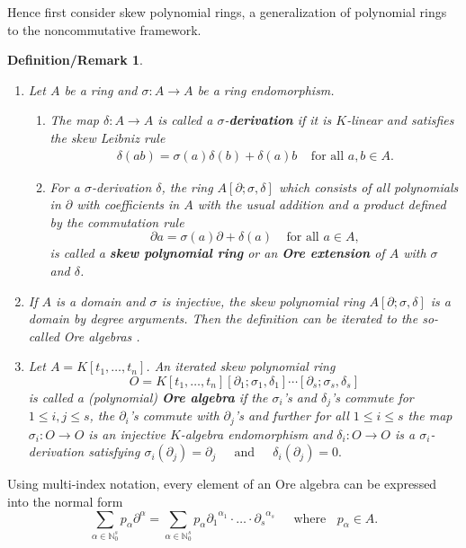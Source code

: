 \documentclass[a4paper,10pt]{article}
\newtheorem{definitionremark}[Th]{Definition/Remark}
\theoremstyle{nonumberplain}
\newcommand{\N}{\mathbb{N}}
\begin{document}
Hence first consider skew polynomial rings, a generalization of polynomial rings to 
the noncommutative framework. 

\begin{definitionremark} \cite{MR} \
\label{defOre}
\begin{enumerate} 
\item[(1)] Let $A$ be a ring and $\sigma : A \rightarrow A$ be a ring endomorphism.
\begin{enumerate} 
\item The map $\delta : A \rightarrow A$ is called a $\sigma$-\textbf{derivation} if it is 
$K$-linear and satisfies the skew Leibniz rule
\begin{align}\label{deltaOperation}
\delta(a b) = \sigma(a) \delta(b) + \delta(a) b \;\;\;\; \mbox{for all } a, b \in A.
\end{align}
\item For a $\sigma$-derivation $\delta$, the ring $A\left[ \partial;\sigma, \delta \right] $ 
which
consists of all polynomials in $\partial$ with coefficients in $A$ with the usual addition 
and a product defined by the commutation rule
$$\partial a = \sigma(a) \partial + \delta(a) \;\;\;\; \mbox{for all } a \in A,$$
is called a \textbf{skew polynomial ring} or an \textbf{Ore extension} of $A$ with $\sigma$ and $\delta$.
\end{enumerate}
\item[] If $A$ is a domain and $\sigma$ is injective, the 
skew polynomial ring $A\left[ \partial;\sigma, \delta \right]$ is a domain by degree arguments. 
Then the definition can be iterated to the so-called Ore algebras \cite{CS}.
\item[(2)] Let $A=K[t_1, \dots, t_n]$. An iterated skew polynomial ring 
$$O=K[t_1, \dots, t_n] [\partial_1;\sigma_1, \delta_1]  \cdots [\partial_s;\sigma_s, \delta_s]$$ 
is called a (polynomial) \textbf{Ore algebra} if the $\sigma_i$'s and $\delta_j$'s commute for $ 1 \leq i , j \leq s $, 
the $\partial_i$'s commute with $\partial_j$'s and further for all $1\leq i \leq s$ the map $\sigma_i:O \rightarrow O$ is 
an injective $K$-algebra endomorphism and $\delta_i:O \rightarrow O $ is a $\sigma_i$-derivation satisfying
$ \sigma_i( \partial_j)= \partial_j \;\;\;\; \mbox{ and }\;\;\;\; \delta_i(\partial_j)=0. $
\end{enumerate}
\end{definitionremark}

Using multi-index notation, every element of an Ore algebra can be expressed into the normal form
$$
\sum_{\alpha \in \N_0^s} p_\alpha \partial^\alpha  = 
\sum_{\alpha \in \N_0^s} p_\alpha {\partial_1}^{\alpha_1} \cdot \ldots \cdot {\partial_s}^{\alpha_s}  
\;\;\;\; \mbox{ where } \;\; p_\alpha \in A.
$$
\end{document}
